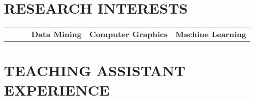 \documentclass[11pt,a4paper,sans]{moderncv}        %
\begin{document}
\section{RESEARCH INTERESTS}

\small{
    \begin{tabular}
        {l@{\hskip 24mm}l@{\hskip 24mm}l}
        ~~~~~~\textbf{\large Data Mining} & \textbf{\large Computer Graphics} & \textbf{\large  Machine Learning}
    \end{tabular}
    \medskip
} %


\vspace{4pt}



\section{TEACHING ASSISTANT EXPERIENCE}
\end{document}
